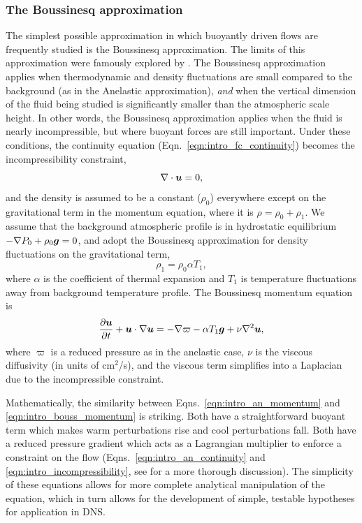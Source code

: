 \subsubsection{The Boussinesq approximation}
The simplest possible approximation in which buoyantly driven flows are frequently studied is the Boussinesq approximation.
The limits of this approximation were famously explored by \citet{spiegel&veronis1960}.
The Boussinesq approximation applies when thermodynamic and density fluctuations are small compared to the background (as in the Anelastic approximation), \emph{and} when the vertical dimension of the fluid being studied is significantly smaller than the atmospheric scale height.
In other words, the Boussinesq approximation applies when the fluid is nearly incompressible, but where buoyant forces are still important.
Under these conditions, the continuity equation (Eqn.~\ref{eqn:intro_fc_continuity}) becomes the incompressibility constraint,
\begin{equation}
\nabla\cdot\bm{u} = 0,
\label{eqn:intro_incompressibility}
\end{equation}
and the density is assumed to be a constant ($\rho_0$) everywhere except on the gravitational term in the momentum equation, where it is $\rho = \rho_0 + \rho_1$.
We assume that the background atmospheric profile is in hydrostatic equilibrium $-\nabla P_0 + \rho_0 \bm{g} = 0$, and adopt the Boussinesq approximation for density fluctuations on the gravitational term,
\begin{equation}
\rho_1 = \rho_0\alpha T_1,
\end{equation}
where $\alpha$ is the coefficient of thermal expansion and $T_1$ is temperature fluctuations away from background temperature profile.
The Boussinesq momentum equation is
\begin{equation}
\frac{\partial \bm{u}}{\partial t} + \bm{u}\cdot\nabla\bm{u} = -\nabla \varpi - \alpha T_1 \bm{g} + \nu \nabla^2 \bm{u},
\label{eqn:intro_bouss_momentum}
\end{equation}
where $\varpi$ is a reduced pressure as in the anelastic case, $\nu$ is the viscous diffusivity (in units of cm$^2$/s), and the viscous term simplifies into a Laplacian due to the incompressible constraint.

Mathematically, the similarity between Eqns.~\ref{eqn:intro_an_momentum} and \ref{eqn:intro_bouss_momentum} is striking.
Both have a straightforward buoyant term which makes warm perturbations rise and cool perturbations fall.
Both have a reduced pressure gradient which acts as a Lagrangian multiplier to enforce a constraint on the flow (Eqns.~\ref{eqn:intro_an_continuity} and \ref{eqn:intro_incompressibility}, see \citet{vasil&all2013} for a more thorough discussion).
The simplicity of these equations allows for more complete analytical manipulation of the equation, which in turn allows for the development of simple, testable hypotheses for application in DNS.

